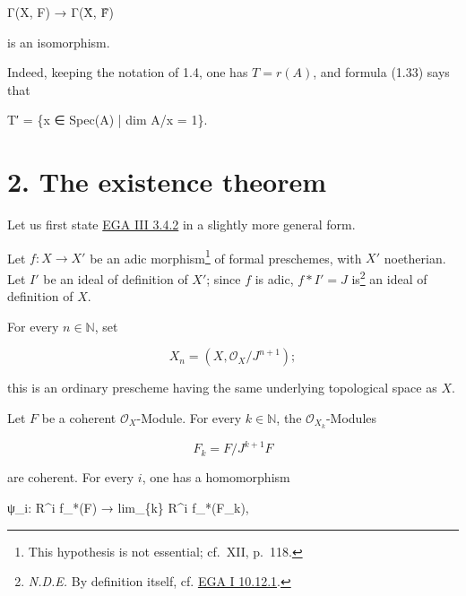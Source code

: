 \documentclass[
  11pt,
  a4paper,
]{book}
\newenvironment{Shaded}{}{}
\newcommand{\NormalTok}[1]{#1}
\begin{document}
\begin{Shaded}
\begin{Highlighting}[]
\NormalTok{Γ(X, F) → Γ(X̂, F̂)}
\end{Highlighting}
\end{Shaded}

is an isomorphism.

Indeed, keeping the notation of 1.4, one has \(T = {r(A)}\), and formula
(1.33) says that

\begin{Shaded}
\begin{Highlighting}[]
\NormalTok{T′ = \{x ∈ Spec(A) | dim A/x = 1\}.}
\end{Highlighting}
\end{Shaded}

\section{2. The existence theorem}\label{the-existence-theorem}

Let us first state
\href{https://jcreinhold.github.io/ega/iii/10-ch3-03-finiteness-proper-morphisms.html\#34-the-finiteness-theorem-case-of-formal-schemes}{EGA
III 3.4.2} in a slightly more general form.

Let \(f: X \to X'\) be an adic morphism\footnote{This hypothesis is not
  essential; cf.~XII, p.~118.} of formal preschemes, with \(X'\)
noetherian. Let \(I'\) be an ideal of definition of \(X'\); since \(f\)
is adic, \(f*I' = J\) is\footnote{\emph{N.D.E.} By definition itself,
  cf.
  \href{https://jcreinhold.github.io/ega/i/01-10-formal-schemes.html\#1012-adic-morphisms-of-formal-preschemes}{EGA
  I 10.12.1}.} an ideal of definition of \(X\).

For every \(n \in \mathbb{N}\), set

\[ X_{n} = (X, \mathcal{O}_{X}/J^{n+1}); \]

this is an ordinary prescheme having the same underlying topological
space as \(X\).

Let \(F\) be a coherent \(\mathcal{O}_{X}\)-Module. For every
\(k \in \mathbb{N}\), the \(\mathcal{O}_{X_{k}}\)-Modules

\[ F_{k} = F/J^{k+1} F \]

are coherent. For every \(i\), one has a homomorphism

\begin{Shaded}
\begin{Highlighting}[]
\NormalTok{ψ\_i: R\^{}i f\_*(F) → lim\_\{k\} R\^{}i f\_*(F\_k),}
\end{Highlighting}
\end{Shaded}
\end{document}
